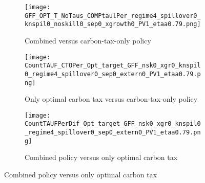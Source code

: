 \begin{figure}[h!!!]
	\centering
	\caption{Deviation of green-to-fossil energy ratio in percent}\label{fig:efftaul_GFF}
	\begin{subfigure}{0.32\textwidth}
		\caption{\footnotesize{Combined versus carbon-tax-only policy}}
		\texttt{[image: GFF\_OPT\_T\_NoTaus\_COMPtaulPer\_regime4\_spillover0\_knspil0\_noskill0\_sep0\_xgrowth0\_PV1\_etaa0.79.png]}
	\end{subfigure}
	\begin{subfigure}{0.32\textwidth}
		\caption{\footnotesize{Only optimal carbon tax versus carbon-tax-only policy}}
		\texttt{[image: CountTAUF\_CTOPer\_Opt\_target\_GFF\_nsk0\_xgr0\_knspil0\_regime4\_spillover0\_sep0\_extern0\_PV1\_etaa0.79.png]}
	\end{subfigure}
	\begin{subfigure}{0.32\textwidth}
		\caption{\footnotesize{Combined policy versus only optimal carbon tax}}
		\texttt{[image: CountTAUFPerDif\_Opt\_target\_GFF\_nsk0\_xgr0\_knspil0\_regime4\_spillover0\_sep0\_extern0\_PV1\_etaa0.79.png]}
	\end{subfigure}		
\end{figure}
